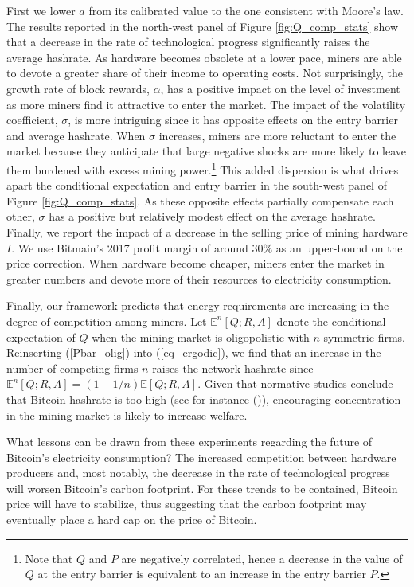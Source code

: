 \documentclass[12pt, a4paper]{article}
\begin{document}
First we lower $a$ from its calibrated value
to the one consistent with Moore's law. The results reported in the north-west panel
of Figure \ref{fig:Q_comp_stats} show that a decrease in the rate of technological progress significantly raises the
average hashrate. As hardware becomes obsolete at a lower pace, miners are able to devote
a greater share of their income to operating costs.
Not surprisingly, the growth rate of block rewards, $\alpha$, has a positive impact on the level
of investment as more miners find it attractive to enter the market. The impact of the volatility
coefficient, $\sigma$, is more intriguing since it has opposite effects on the entry barrier and
average hashrate. When $\sigma$ increases, miners are more reluctant to enter the market because
they anticipate that large negative shocks are more likely to leave them burdened with excess mining power.\footnote{Note that $Q$ and $P$ are
negatively correlated, hence a decrease in the
value of $Q$ at the entry barrier is equivalent to an increase in the entry barrier $\overline{P}$.}
This added dispersion is what drives apart the conditional expectation
and entry barrier in the south-west panel of Figure \ref{fig:Q_comp_stats}. As these opposite effects partially compensate
each other, $\sigma$ has a positive but relatively modest effect on the average hashrate.
Finally, we report the impact of a decrease in the selling price of mining hardware $I$.
We use Bitmain's 2017 profit margin of around $30 \% $ as an upper-bound on the price correction.
When hardware become cheaper, miners enter the market in greater numbers and
devote more of their resources to electricity consumption.

Finally, our framework predicts that energy requirements are increasing in the degree of competition among miners.
Let $\mathbb{E}^n[Q;R,A]$ denote the conditional expectation of $Q$ when the mining market is oligopolistic with $n$ symmetric firms.
Reinserting (\ref{Pbar_olig}) into (\ref{eq_ergodic}), we find that an increase in the number of competing firms $n$ raises the network hashrate since $\mathbb{E}^n[Q;R,A]=\left(1-1/n\right)\mathbb{E}[Q;R,A]$.
Given that normative studies conclude that Bitcoin hashrate is too high (see for instance \citeauthor{Huberman} (\citeyear{Huberman})),
encouraging concentration in the mining market is likely to increase welfare.

What lessons can be drawn from these experiments regarding the future of
Bitcoin's electricity consumption? The increased competition between
hardware producers and, most notably, the decrease in the rate of technological
progress will worsen Bitcoin's carbon footprint. For these trends to be contained,
Bitcoin price will have to stabilize, thus suggesting that the carbon footprint
may eventually place a hard cap on the price of Bitcoin.
\end{document}
